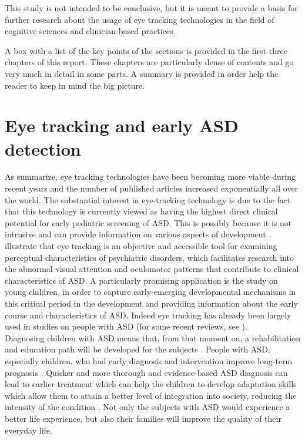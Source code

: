 This study is not intended to be conclusive, but it is meant to provide a basis for further research about the usage of eye tracking technologies in the field of cognitive sciences and clinician-based practices.

A box with a list of the key points of the sections is provided in the first three chapters of this report. These chapters are particularly dense of contents and go very much in detail in some parts. A summary is provided in order help the reader to keep in mind the big picture.


\section{Eye tracking and early ASD detection}
\label{sec:earlyASD}

As \cite{bolte2016detection} summarize, eye tracking technologies have been becoming more viable during recent years and the number of published articles increased exponentially all over the world. The substantial interest in eye-tracking technology is due to the fact that this technology is currently viewed as having the highest direct clinical potential for early pediatric screening of ASD. This is possibly because it is not intrusive and can provide information on various aspects of development  \citep{bolte2016detection,falck-ytter2013eyetrackingASD,subrahmaniam2013animation,sasson2012children}.\\
\cite{sasson2012children} illustrate that eye tracking is an objective and accessible tool for examining perceptual characteristics of psychiatric disorders, which facilitates research into the abnormal visual attention and oculomotor patterns that contribute to clinical characteristics of ASD. A particularly promising application is the study on young children, in order to capture early-emerging developmental mechanisms in this critical period in the development and providing information about the early course and characteristics of ASD. Indeed eye tracking has already been largely used in studies on people with ASD (for some recent reviews, see \citealp{boraston2007eyetrackingASD,brenner2007visualsearch,falck-ytter2013eyetrackingASD,papagiannopoulou2014review,chitategmark2016socialattention,johnson2016review,bolte2016detection,frazier2017socialgaze}).\\
Diagnosing children with ASD means that, from that moment on, a rehabilitation and education path will be developed for the subjects \citep{apa2017diagnosis}. People with ASD, especially children, who had early diagnosis and intervention improve long-term prognosis \citep{vargas2016diagnosis}. Quicker and more thorough and evidence-based ASD diagnosis can lead to earlier treatment which can help the children to develop adaptation skills which allow them to attain a better level of integration into society, reducing the intensity of the condition \citep{martineau2011pupil,towie2016screening}. Not only the subjects with ASD would experience a better life experience, but also their families will improve the quality of their everyday life.\\

